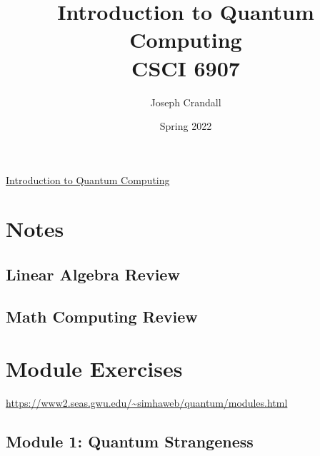 
\usepackage{algorithm, algpseudocode, color, gensymb, siunitx, soul, subfiles}
\usepackage[a4paper, total={7.5in, 10in}]{geometry}

\title{Introduction to Quantum Computing\\
\large CSCI 6907}
\author{Joseph Crandall}
\date{Spring 2022}


\maketitle

\href{https://www2.seas.gwu.edu/~simhaweb/quantum/index.html}{Introduction to Quantum Computing}

\section{Notes}

\subsection{Linear Algebra Review}


\subsection{Math Computing Review}


%

%

%

\section{Module Exercises}

\url{https://www2.seas.gwu.edu/~simhaweb/quantum/modules.html}

\subsection{Module 1: Quantum Strangeness}


